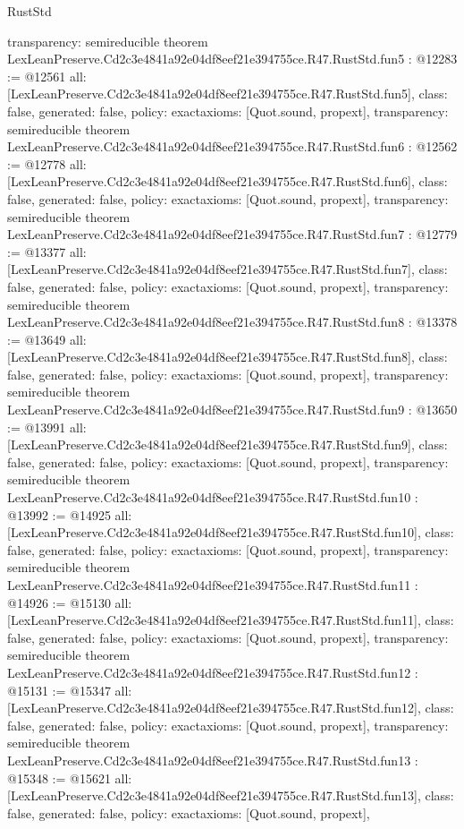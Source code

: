 \begin{lexlean}{RustStd}
\begin{coremodule}
{  transparency: semireducible
}
theorem LexLeanPreserve.Cd2c3e4841a92e04df8eef21e394755ce.R47.RustStd.fun5 : @12283 := @12561 {
  all: [LexLeanPreserve.Cd2c3e4841a92e04df8eef21e394755ce.R47.RustStd.fun5],
  class: false,
  generated: false,
  policy: exact{axioms: [Quot.sound, propext]},
  transparency: semireducible
}
theorem LexLeanPreserve.Cd2c3e4841a92e04df8eef21e394755ce.R47.RustStd.fun6 : @12562 := @12778 {
  all: [LexLeanPreserve.Cd2c3e4841a92e04df8eef21e394755ce.R47.RustStd.fun6],
  class: false,
  generated: false,
  policy: exact{axioms: [Quot.sound, propext]},
  transparency: semireducible
}
theorem LexLeanPreserve.Cd2c3e4841a92e04df8eef21e394755ce.R47.RustStd.fun7 : @12779 := @13377 {
  all: [LexLeanPreserve.Cd2c3e4841a92e04df8eef21e394755ce.R47.RustStd.fun7],
  class: false,
  generated: false,
  policy: exact{axioms: [Quot.sound, propext]},
  transparency: semireducible
}
theorem LexLeanPreserve.Cd2c3e4841a92e04df8eef21e394755ce.R47.RustStd.fun8 : @13378 := @13649 {
  all: [LexLeanPreserve.Cd2c3e4841a92e04df8eef21e394755ce.R47.RustStd.fun8],
  class: false,
  generated: false,
  policy: exact{axioms: [Quot.sound, propext]},
  transparency: semireducible
}
theorem LexLeanPreserve.Cd2c3e4841a92e04df8eef21e394755ce.R47.RustStd.fun9 : @13650 := @13991 {
  all: [LexLeanPreserve.Cd2c3e4841a92e04df8eef21e394755ce.R47.RustStd.fun9],
  class: false,
  generated: false,
  policy: exact{axioms: [Quot.sound, propext]},
  transparency: semireducible
}
theorem LexLeanPreserve.Cd2c3e4841a92e04df8eef21e394755ce.R47.RustStd.fun10 : @13992 := @14925 {
  all: [LexLeanPreserve.Cd2c3e4841a92e04df8eef21e394755ce.R47.RustStd.fun10],
  class: false,
  generated: false,
  policy: exact{axioms: [Quot.sound, propext]},
  transparency: semireducible
}
theorem LexLeanPreserve.Cd2c3e4841a92e04df8eef21e394755ce.R47.RustStd.fun11 : @14926 := @15130 {
  all: [LexLeanPreserve.Cd2c3e4841a92e04df8eef21e394755ce.R47.RustStd.fun11],
  class: false,
  generated: false,
  policy: exact{axioms: [Quot.sound, propext]},
  transparency: semireducible
}
theorem LexLeanPreserve.Cd2c3e4841a92e04df8eef21e394755ce.R47.RustStd.fun12 : @15131 := @15347 {
  all: [LexLeanPreserve.Cd2c3e4841a92e04df8eef21e394755ce.R47.RustStd.fun12],
  class: false,
  generated: false,
  policy: exact{axioms: [Quot.sound, propext]},
  transparency: semireducible
}
theorem LexLeanPreserve.Cd2c3e4841a92e04df8eef21e394755ce.R47.RustStd.fun13 : @15348 := @15621 {
  all: [LexLeanPreserve.Cd2c3e4841a92e04df8eef21e394755ce.R47.RustStd.fun13],
  class: false,
  generated: false,
  policy: exact{axioms: [Quot.sound, propext]},
}
\end{coremodule}
\end{lexlean}
